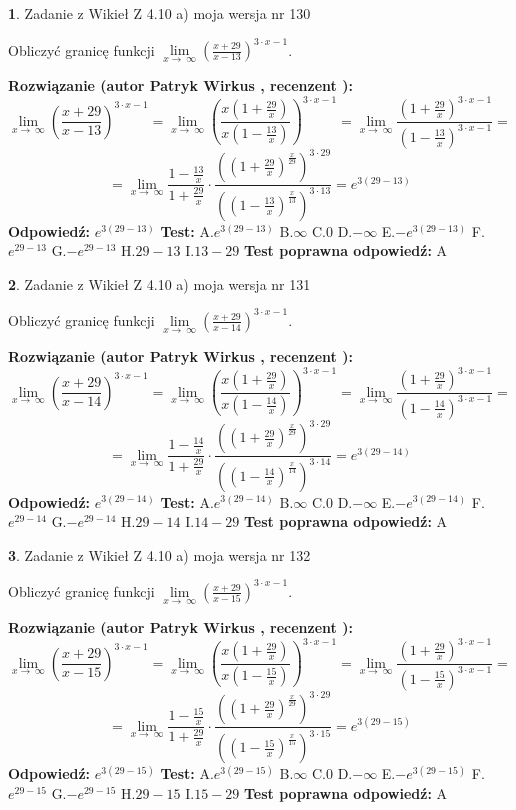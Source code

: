 \documentclass[12pt, a4paper]{article}
\theoremstyle{definition} %
\newtheorem{zad}{}
\newcommand{\zadStart}[1]{\begin{zad}#1\newline}
\newcommand{\zadStop}{\end{zad}}
\newcommand{\rozwStart}[2]{\noindent \textbf{Rozwiązanie (autor #1 , recenzent #2): }\newline}
\newcommand{\rozwStop}{\newline}
\newcommand{\odpStart}{\noindent \textbf{Odpowiedź:}\newline}
\newcommand{\odpStop}{\newline}
\newcommand{\testStart}{\noindent \textbf{Test:}\newline}
\newcommand{\testStop}{\newline}
\newcommand{\kluczStart}{\noindent \textbf{Test poprawna odpowiedź:}\newline}
\newcommand{\kluczStop}{\newline}
\begin{document}
\zadStart{Zadanie z Wikieł Z 4.10 a) moja wersja nr 130}


Obliczyć granicę funkcji  $\lim\limits_{x\to\ \infty}(\frac{x+29}{x-13})^{3\cdot x-1}$.
\zadStop
\rozwStart{Patryk Wirkus}{}
$$\lim\limits_{x\to\ \infty}(\frac{x+29}{x-13})^{3\cdot x-1} = \lim\limits_{x\to\ \infty}(\frac{x(1+\frac{29}{x})}{x(1-\frac{13}{x})})^{3\cdot x-1}=\lim\limits_{x\to\ \infty}\frac{(1+\frac{29}{x})^{3\cdot x-1}}{(1-\frac{13}{x})^{3\cdot x-1}}=$$
$$=\lim\limits_{x\to\ \infty}\frac{1-\frac{13}{x}}{1+\frac{29}{x}}\cdot\frac{((1+\frac{29}{x})^{\frac{x}{29}})^{3\cdot29}}{((1-\frac{13}{x})^{\frac{x}{13}})^{3\cdot13}}=e^{3(29-13)}$$
\rozwStop
\odpStart
$e^{3(29-13)}$
\odpStop
\testStart
A.$e^{3(29-13)}$ B.$\infty$ C.$0$ D.$-\infty$ E.$-e^{3(29-13)}$
F.$e^{29-13}$ G.$-e^{29-13}$
H.$29-13$
I.$13-29$
\testStop
\kluczStart
A
\kluczStop



\zadStart{Zadanie z Wikieł Z 4.10 a) moja wersja nr 131}


Obliczyć granicę funkcji  $\lim\limits_{x\to\ \infty}(\frac{x+29}{x-14})^{3\cdot x-1}$.
\zadStop
\rozwStart{Patryk Wirkus}{}
$$\lim\limits_{x\to\ \infty}(\frac{x+29}{x-14})^{3\cdot x-1} = \lim\limits_{x\to\ \infty}(\frac{x(1+\frac{29}{x})}{x(1-\frac{14}{x})})^{3\cdot x-1}=\lim\limits_{x\to\ \infty}\frac{(1+\frac{29}{x})^{3\cdot x-1}}{(1-\frac{14}{x})^{3\cdot x-1}}=$$
$$=\lim\limits_{x\to\ \infty}\frac{1-\frac{14}{x}}{1+\frac{29}{x}}\cdot\frac{((1+\frac{29}{x})^{\frac{x}{29}})^{3\cdot29}}{((1-\frac{14}{x})^{\frac{x}{14}})^{3\cdot14}}=e^{3(29-14)}$$
\rozwStop
\odpStart
$e^{3(29-14)}$
\odpStop
\testStart
A.$e^{3(29-14)}$ B.$\infty$ C.$0$ D.$-\infty$ E.$-e^{3(29-14)}$
F.$e^{29-14}$ G.$-e^{29-14}$
H.$29-14$
I.$14-29$
\testStop
\kluczStart
A
\kluczStop



\zadStart{Zadanie z Wikieł Z 4.10 a) moja wersja nr 132}


Obliczyć granicę funkcji  $\lim\limits_{x\to\ \infty}(\frac{x+29}{x-15})^{3\cdot x-1}$.
\zadStop
\rozwStart{Patryk Wirkus}{}
$$\lim\limits_{x\to\ \infty}(\frac{x+29}{x-15})^{3\cdot x-1} = \lim\limits_{x\to\ \infty}(\frac{x(1+\frac{29}{x})}{x(1-\frac{15}{x})})^{3\cdot x-1}=\lim\limits_{x\to\ \infty}\frac{(1+\frac{29}{x})^{3\cdot x-1}}{(1-\frac{15}{x})^{3\cdot x-1}}=$$
$$=\lim\limits_{x\to\ \infty}\frac{1-\frac{15}{x}}{1+\frac{29}{x}}\cdot\frac{((1+\frac{29}{x})^{\frac{x}{29}})^{3\cdot29}}{((1-\frac{15}{x})^{\frac{x}{15}})^{3\cdot15}}=e^{3(29-15)}$$
\rozwStop
\odpStart
$e^{3(29-15)}$
\odpStop
\testStart
A.$e^{3(29-15)}$ B.$\infty$ C.$0$ D.$-\infty$ E.$-e^{3(29-15)}$
F.$e^{29-15}$ G.$-e^{29-15}$
H.$29-15$
I.$15-29$
\testStop
\kluczStart
A
\kluczStop
\end{document}
